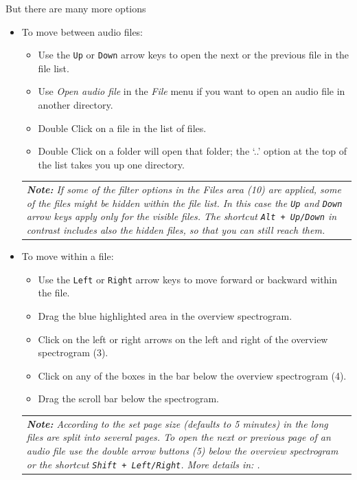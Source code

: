 \documentclass{scrartcl}
\begin{document}
But there are many more options
\begin{itemize}
	\item To move between audio files: 
	\begin{itemize}
		\item Use the \texttt{Up} or \texttt{Down} arrow keys to open the next or the previous file in the file list.
		\item Use \textit{Open audio file} in the \textit{File} menu if you want to open an audio file in another directory.
		\item Double Click on a file in the list of files.
		\item Double Click on a folder will open that folder; the `..' option at the top of the list takes you up one directory.
	\end{itemize}
	
	\begin{table}[ht!]
		\centering
		\begin{tabular}{p{}}
			\textit{\textbf{Note:} If some of the filter options in the Files area (10) are applied, some of the files might be hidden within the file list. In this case the \texttt{Up} and \texttt{Down} arrow keys apply only for the visible files. The shortcut \texttt{Alt + Up/Down} in contrast includes also the hidden files, so that you can still reach them.}\\
		\end{tabular}
	\end{table}

	\item To move within a file:
	\begin{itemize}
		\item Use the \texttt{Left} or \texttt{Right} arrow keys to move forward or backward within the file.
		\item Drag the blue highlighted area in the overview spectrogram. 
		\item Click on the left or right arrows on the left and right of the overview spectrogram (3).
		\item Click on any of the boxes in the bar below the overview spectrogram (4).
		\item Drag the scroll bar below the spectrogram.
	\end{itemize}
	\begin{table}[ht!]
		\centering
		\begin{tabular}{p{}}
			\textit{\textbf{Note:} According to the set page size (defaults to 5 minutes) in the \textit{\nameref{sec:interfacesettings}} long files are split into several pages. To open the next or previous page of an audio file use the double arrow buttons (5) below the overview spectrogram or the shortcut \texttt{Shift + Left/Right}. More details in: \nameref{sec:longfiles}.}\\
		\end{tabular}
	\end{table}


\end{itemize}
\end{document}
